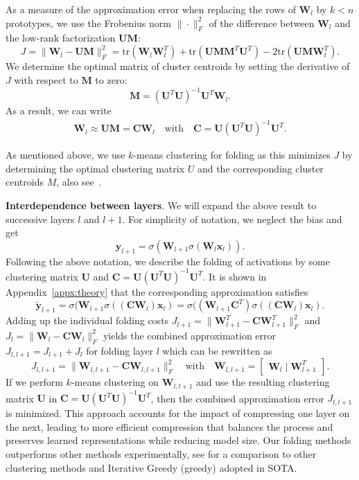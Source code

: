 \documentclass{article}
\newcommand\fakeparagraph[1]{\par\noindent\textbf{{#1}}.\xspace}
\begin{document}
As a measure of the approximation error when replacing the rows of $\mathbf{W}_l$ by $k<n$ prototypes, we use the Frobenius norm $\|\cdot\|_F^2$ of the difference between $\mathbf{W}_l$ and the low-rank factorization $\mathbf{U}\mathbf{M}$:
\[
J = \|\mathbf{W}_l - \mathbf{U} \mathbf{M}\|_F^2 = \text{tr}(\mathbf{W}_l \mathbf{W}_l^T) + \text{tr}(\mathbf{U} \mathbf{M}\mathbf{M}^T \mathbf{U}^T) - 2 \text{tr}(\mathbf{U} \mathbf{M}\mathbf{W}_l^T).
\]
We determine the optimal matrix of cluster centroids by setting the derivative of $J$ with respect to $\mathbf{M}$ to zero:
\[
\mathbf{M} = (\mathbf{U}^T \mathbf{U})^{-1} \mathbf{U}^T \mathbf{W}_l.
\]
As a result, we can write
\begin{align*}
    \mathbf{W}_l \approx \mathbf{U} \mathbf{M} = \mathbf{C} \mathbf{W}_l \quad \text{with} \quad \mathbf{C} = \mathbf{U} (\mathbf{U}^T \mathbf{U})^{-1} \mathbf{U}^T.
\end{align*}

As mentioned above, we use $k$-means clustering for folding as this minimizes $J$ by determining the optimal clustering matrix $U$ and the corresponding cluster centroids $M$, also see~\citep{bauckhage2015kmeansclusteringmatrixfactorization}. 


\fakeparagraph{Interdependence between layers}
We will expand the above result to successive layers $l$ and $l+1$. For simplicity of notation, we neglect the bias and get 
\[
    \mathbf{y}_{l+1} = \sigma(\mathbf{W}_{l+1} \sigma(\mathbf{W}_l \mathbf{x}_l)).
\]
Following the above notation, we describe the folding of activations by some clustering matrix $\mathbf{U}$ and $\mathbf{C} = \mathbf{U} (\mathbf{U}^T \mathbf{U})^{-1} \mathbf{U}^T$. It is shown in Appendix~\ref{appx:theory} that the corresponding approximation satisfies
\[
    \mathbf{\tilde{y}}_{l+1} = \sigma(\mathbf{W}_{l+1} \sigma((\mathbf{C} \mathbf{W}_l) \mathbf{x}_l) = \sigma((\mathbf{W}_{l+1} \mathbf{C}^T) \sigma((\mathbf{C} \mathbf{W}_l) \mathbf{x}_l).
\]
Adding up the individual folding costs $J_{l+1} = \|\mathbf{W}_{l+1}^T - \mathbf{C} \mathbf{W}_{l+1}^T \|_F^2$ and $J_{l} = \|\mathbf{W}_{l} - \mathbf{C} \mathbf{W}_{l} \|_F^2$ yields the combined approximation error $J_{l, l+1} = J_{l+1} + J_{l}$ for folding layer $l$ which can be rewritten as 
\[
    J_{l, l+1} = \|\mathbf{W}_{l, l+1} - \mathbf{C} \mathbf{W}_{l, l+1}\|_F^2 \quad \text{with} \quad 
    \mathbf{W}_{l, l+1} = 
        \begin{bmatrix}
            \mathbf{W}_l \mid \mathbf{W}_{l+1}^T
        \end{bmatrix}.
\]
If we perform $k$-means clustering on $\mathbf{W}_{l, l+1}$ and use the resulting clustering matrix $\mathbf{U}$ in $\mathbf{C} = \mathbf{U} (\mathbf{U}^T \mathbf{U})^{-1} \mathbf{U}^T $, then the combined approximation error $J_{l, l+1}$ is minimized. This approach accounts for the impact of compressing one layer on the next, leading to more efficient compression that balances the process and preserves learned representations while reducing model size. Our folding methods outperforms other methods experimentally, see  for a comparison to other clustering methods and Iterative Greedy (greedy) adopted in SOTA.
\end{document}
